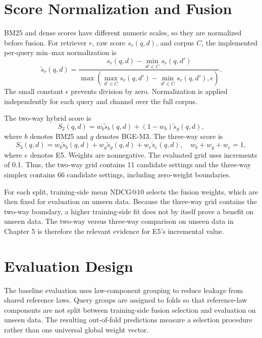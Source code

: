 \section{Score Normalization and Fusion}

BM25 and dense scores have different numeric scales, so they are normalized before fusion. For retriever \(r\), raw score \(s_r(q,d)\), and corpus \(C\), the implemented per-query min--max normalization is
\[
\widetilde{s}_r(q,d)=\frac{s_r(q,d)-\min_{d'\in C}s_r(q,d')}{\max\left(\max_{d'\in C}s_r(q,d')-\min_{d'\in C}s_r(q,d'),\epsilon\right)}.
\]
The small constant \(\epsilon\) prevents division by zero. Normalization is applied independently for each query and channel over the full corpus.

The two-way hybrid score is
\[
S_2(q,d)=w_b\widetilde{s}_{b}(q,d)+(1-w_b)\widetilde{s}_{g}(q,d),
\]
where \(b\) denotes BM25 and \(g\) denotes BGE-M3. The three-way score is
\[
S_3(q,d)=w_b\widetilde{s}_{b}(q,d)+w_g\widetilde{s}_{g}(q,d)+w_e\widetilde{s}_{e}(q,d),\quad w_b+w_g+w_e=1,
\]
where \(e\) denotes E5. Weights are nonnegative. The evaluated grid uses increments of 0.1. Thus, the two-way grid contains 11 candidate settings and the three-way simplex contains 66 candidate settings, including zero-weight boundaries.

For each split, training-side mean NDCG@10 selects the fusion weights, which are then fixed for evaluation on unseen data. Because the three-way grid contains the two-way boundary, a higher training-side fit does not by itself prove a benefit on unseen data. The two-way versus three-way comparison on unseen data in Chapter 5 is therefore the relevant evidence for E5's incremental value.

\section{Evaluation Design}

The baseline evaluation uses law-component grouping to reduce leakage from shared reference laws. Query groups are assigned to folds so that reference-law components are not split between training-side fusion selection and evaluation on unseen data. The resulting out-of-fold predictions measure a selection procedure rather than one universal global weight vector.

